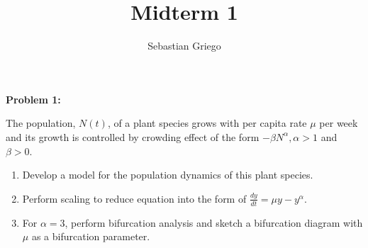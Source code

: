 \documentclass[12pt]{article}
\newenvironment{problem}[1]{
    \textbf{Problem #1:}
}{
    \rmfamily \vspace{1em}
}
\begin{document}
\title{Midterm 1}  %
\author{Sebastian Griego}  %


\begin{problem}{1}
    The population, \(N(t)\), of a plant species grows with per capita rate \(\mu\) per week and its growth is controlled by crowding effect of the form \(- \beta N^\alpha, \alpha > 1\) and \(\beta > 0\).
    \begin{enumerate}
        \item Develop a model for the population dynamics of this plant species.
        \item Perform scaling to reduce equation into the form of \(\frac{dy}{dt} = \mu y - y^\alpha\).
        \item For \(\alpha = 3\), perform bifurcation analysis and sketch a bifurcation diagram with \(\mu\) as a bifurcation parameter.
    \end{enumerate}
\end{problem}
\end{document}
